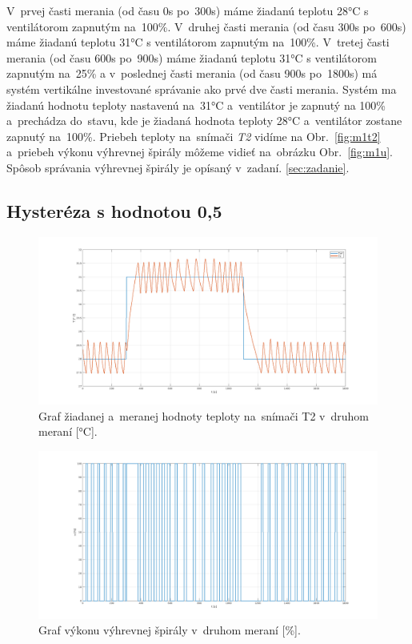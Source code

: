 \documentclass{article}
\begin{document}
V~prvej časti merania (od času 0s po~300s) máme žiadanú teplotu 28°C s ventilátorom zapnutým na~100\%.
V~druhej časti merania (od času 300s po~600s) máme žiadanú teplotu 31°C s ventilátorom zapnutým na~100\%.
V~tretej časti merania (od času 600s po~900s) máme žiadanú teplotu 31°C s ventilátorom zapnutým na~25\% a
v~poslednej časti merania (od času 900s po~1800s) má systém vertikálne investované správanie ako prvé
dve časti merania. Systém ma žiadanú hodnotu teploty nastavenú na~31°C a~ventilátor je zapnutý na 100\%
a~prechádza do~stavu, kde je žiadaná hodnota teploty 28°C a~ventilátor zostane zapnutý na~100\%.
Priebeh teploty na~snímači \textit{T2} vidíme na Obr.~\ref{fig:m1t2} a~priebeh výkonu výhrevnej špirály
môžeme vidieť na~obrázku Obr.~\ref{fig:m1u}. Spôsob správania výhrevnej špirály je opísaný v~zadaní.
\ref{sec:zadanie}.

\clearpage

\subsection{Hysteréza s hodnotou 0,5}
\label{sec:meranie2}

\begin{figure}[!htbp]
	\begin{center}
		\includegraphics[width=\textwidth]{./include/m2T2.png}
	\end{center}
	\caption{Graf žiadanej a~meranej hodnoty teploty na~snímači T2 v~druhom meraní [°C].}
	\label{fig:m2t2}
\end{figure}

\clearpage

\begin{figure}[!htbp]
	\begin{center}
		\includegraphics[width=\textwidth]{./include/m2u.png}
	\end{center}
	\caption{Graf výkonu výhrevnej špirály v~druhom meraní [\%].}
	\label{fig:m2u}
\end{figure}
\end{document}
